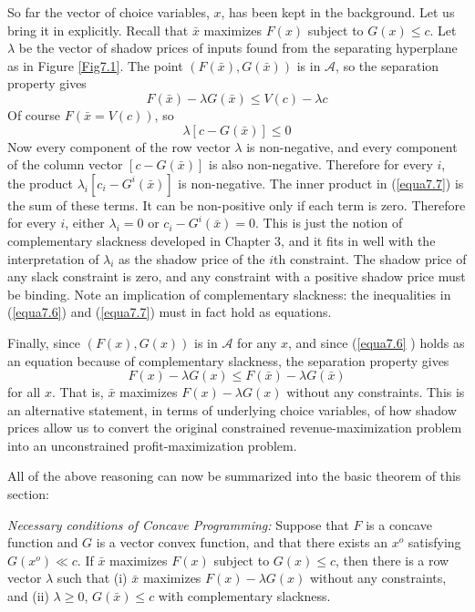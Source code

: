 So far the vector of choice variables, $x$, has been kept in the background. Let us bring it in explicitly. Recall that $\bar{x}$ maximizes $F(x)$  subject to $G(x ) \leq c$. Let $\lambda$ be the vector of shadow prices of inputs found from the separating hyperplane as in Figure \ref{Fig7.1}. The point $(F(\bar{x}), G(\bar{x}))$ is in $\mathcal{A}$, so the separation property gives
\begin{equation} \label{equa7.6}
F(\bar{x}) -\lambda G(\bar{x}) \leq V(c) - \lambda c
\end{equation}
Of course $F(\bar{x} = V(c))$, so
\begin{equation} \label{equa7.7}
\lambda [c- G(\bar{x})] \leq 0
\end{equation}
Now every component of the row vector $\lambda$ is non-negative, and every component of the column vector $[c- G(\bar{x})]$ is also non-negative. Therefore for every $i$, the product $\lambda_i [c_i - G^i(\bar{x})]$ is non-negative. The inner product in (\ref{equa7.7}) is the sum of these terms. It can be non-positive only if each term is zero. Therefore for every $i$, either $\lambda_i =0$ or $c_i -G^i(\bar{x}) =0$. This is just the notion of complementary slackness developed in Chapter 3, and it fits in well with the interpretation of $\lambda_i$ as the shadow price of the $i$th constraint. The shadow price of any slack constraint is zero, and any constraint with a positive shadow price must be binding. Note an implication of complementary slackness: the inequalities in (\ref{equa7.6}) and (\ref{equa7.7}) must in fact hold as equations.

Finally, since $(F(x), G(x))$ is in $\mathcal{A}$ for any $x$, and since (\ref{equa7.6} ) holds as an equation because of complementary slackness, the separation property gives
\begin{equation} \label{equa7.8}
F(x) - \lambda G(x) \leq F(\bar{x}) - \lambda G(\bar{x})
\end{equation}
for all $x$. That is, $\bar{x}$ maximizes $F(x) -\lambda G(x) $ without any constraints. This is an alternative statement, in terms of underlying choice variables, of how shadow prices allow us to convert the original constrained revenue-maximization problem into an unconstrained profit-maximization problem.

All of the above reasoning can now be summarized into the basic theorem of this section:

\textit{Necessary conditions of Concave Programming:} Suppose that $F$ is a concave function and $G$ is a vector convex function, and that there exists an $x^o$ satisfying $G(x^o) \ll c$. If $\bar{x}$ maximizes $F(x)$ subject to $G(x) \leq c$, then there is a row vector $\lambda$ such that (i) $\bar{x}$ maximizes $F(x) - \lambda G(x)$ without any constraints, and (ii) $\lambda \geq 0$, $G(\bar{x}) \leq c$ with complementary slackness.

